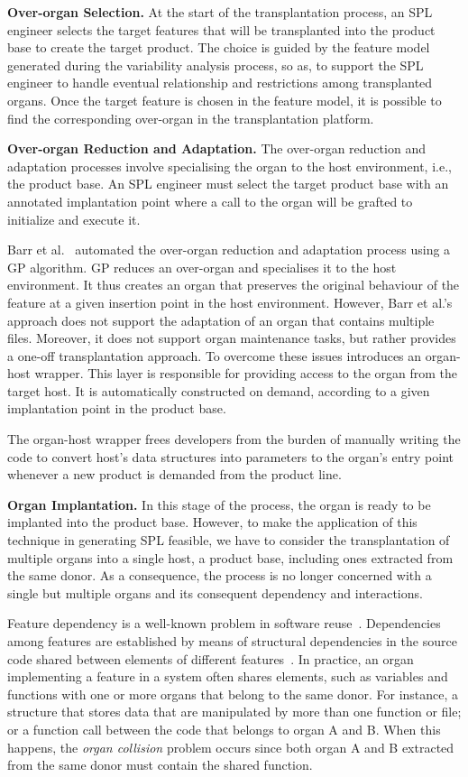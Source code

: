 \textbf{Over-organ Selection.} At the start of the transplantation process, an SPL engineer selects the target features that will be transplanted into the product base to create the target product. 
The choice is guided by the feature model generated during the variability analysis process, so as, to support the SPL engineer to handle eventual relationship and restrictions among transplanted organs. Once the target feature is chosen in the feature model, it is possible to find the corresponding over-organ in the transplantation platform.

\textbf{Over-organ Reduction and Adaptation.} The over-organ reduction and adaptation processes involve specialising the organ to the host environment, i.e., the product base. An SPL engineer must select the target product base with an annotated implantation point where a call to the organ will be grafted to initialize and execute it. 

Barr et al.~\cite{Barr2015} automated the over-organ reduction and adaptation process using a GP algorithm.
GP reduces an over-organ and specialises it to the host environment.
It thus creates an organ that preserves the original behaviour of the feature at a given insertion point in the host environment. 
However, Barr et al.'s approach does not support the adaptation of an organ that contains multiple files. 
Moreover, it does not support organ maintenance tasks, but rather provides a one-off transplantation approach.
To overcome these issues \FOUNDRY introduces an organ-host wrapper.
This layer is responsible for providing access to the organ from the target host. 
It is automatically constructed on demand, according to a given implantation point in the product base. 

The organ-host wrapper frees developers from the burden of manually writing the code to convert host's data structures into parameters to the organ's entry point whenever a new product is demanded from the product line.

\label{implantation}
\textbf{Organ Implantation.} In this stage of the process, the organ is ready to be implanted into the product base. 
However, to make the application of this technique in generating SPL feasible, we have to consider the transplantation of multiple organs into a single host, a product base, including ones extracted from the same donor. 
As a consequence, the process is no longer concerned with a single but multiple organs and its consequent dependency and interactions.

Feature dependency is a well-known problem in software reuse~\cite{Ribeiro2011}. Dependencies among features are established by means of structural dependencies in the source code shared between elements of different features~\cite{CafeoA2016}. In practice, an organ implementing a feature in a system often shares elements, such as variables and functions with one or more organs that belong to the same donor. For instance, a structure that stores data that are manipulated by more than one function or file; or a function call between the code that belongs to organ A and B. When this happens, the \emph{organ collision} problem occurs since both organ A and B extracted from the same donor must contain the shared function. 

